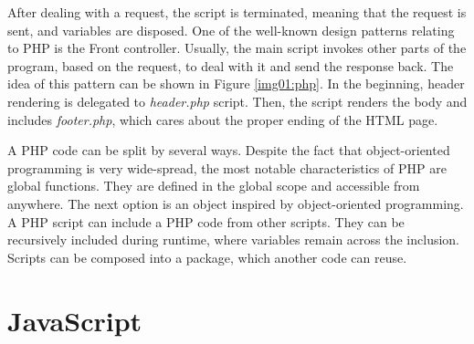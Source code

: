 After dealing with a request, the script is terminated, meaning that the request is sent, and variables are disposed.
One of the well-known design patterns relating to PHP is the Front controller.
Usually, the main script invokes other parts of the program, based on the request, to deal with it and send the response back.
The idea of this pattern can be shown in Figure \ref{img01:php}.
In the beginning, header rendering is delegated to \textit{header.php} script.
Then, the script renders the body and includes \textit{footer.php}, which cares about the proper ending of the HTML page.
\par
A PHP code can be split by several ways.
Despite the fact that object-oriented programming is very wide-spread, the most notable characteristics of PHP are global functions.
They are defined in the global scope and accessible from anywhere.
The next option is an object inspired by object-oriented programming.
A PHP script can include a PHP code from other scripts.
They can be recursively included during runtime, where variables remain across the inclusion.
Scripts can be composed into a package, which another code can reuse.

\section{JavaScript}

